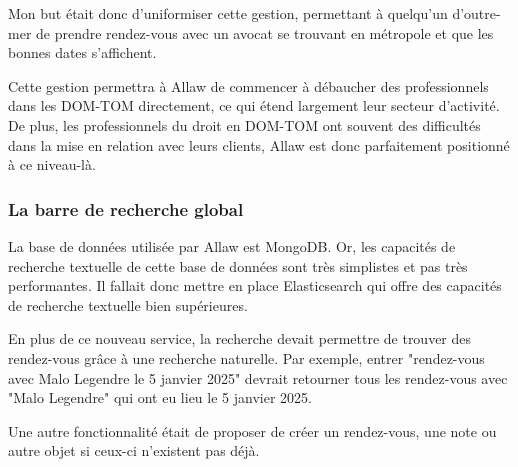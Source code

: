 Mon but était donc d'uniformiser cette gestion, permettant à quelqu'un
d'outre-mer de prendre rendez-vous avec un avocat se trouvant en métropole et
que les bonnes dates s'affichent.

Cette gestion permettra à Allaw de commencer à débaucher des professionnels
dans les DOM-TOM directement, ce qui étend largement leur secteur d'activité.
De plus, les professionnels du droit en DOM-TOM ont souvent des difficultés dans
la mise en relation avec leurs clients, Allaw est donc parfaitement positionné à
ce niveau-là.

\subsubsection{La barre de recherche global}

La base de données utilisée par Allaw est MongoDB. Or, les capacités de
recherche textuelle de cette base de données sont très simplistes et pas très
performantes. Il fallait donc mettre en place Elasticsearch qui offre des
capacités de recherche textuelle bien supérieures.

En plus de ce nouveau service, la recherche devait permettre de trouver des
rendez-vous grâce à une recherche naturelle. Par exemple, entrer "rendez-vous
avec Malo Legendre le 5 janvier 2025" devrait retourner tous les rendez-vous
avec "Malo Legendre" qui ont eu lieu le 5 janvier 2025.

Une autre fonctionnalité était de proposer de créer un rendez-vous, une note ou
autre objet si ceux-ci n'existent pas déjà.
